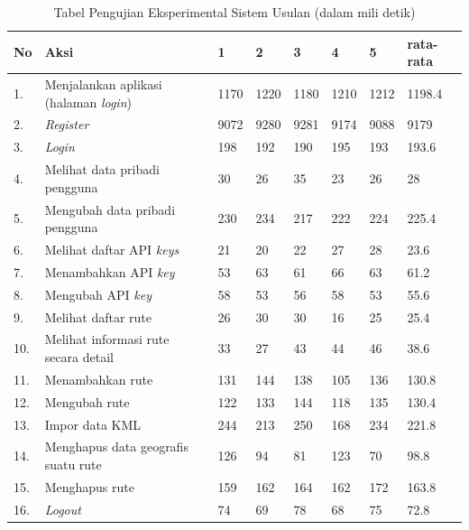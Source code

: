 \begin{table}[htbp]
	\centering
	\caption{Tabel Pengujian Eksperimental Sistem Usulan (dalam mili detik)}
		\begin{tabular}{|p{0.37cm}| p{7cm}| p{1cm}| p{1cm}| p{1cm}| p{1cm}| p{1cm}| p{1cm}|} \hline
		No & Aksi & 1 & 2 & 3 & 4 & 5 & rata-rata \\ \hline
		1. & Menjalankan aplikasi (halaman \textit{login}) & 1170	&	1220	&	1180	&	1210	&	1212	&	1198.4 \\ \hline
 		2. & \textit{Register} & 9072	&	9280	&	9281	&	9174	&	9088	&	9179 \\ \hline
		3. & \textit{Login} & 198	&	192	&	190	&	195	&	193	&	193.6 \\ \hline
		4. & Melihat data pribadi pengguna & 30	&	26	&	35	&	23	&	26	&	28 \\ \hline
		5. & Mengubah data pribadi pengguna & 230	&	234	&	217	&	222	&	224	&	225.4 \\ \hline
		6. & Melihat daftar API \textit{keys} & 21	&	20	&	22	&	27	&	28	&	23.6 \\ \hline
		7. & Menambahkan API \textit{key} & 53	&	63	&	61	&	66	&	63	&	61.2 \\ \hline
		8. & Mengubah API \textit{key} & 58	&	53	&	56	&	58	&	53	&	55.6 \\ \hline
		9. & Melihat daftar rute & 26	&	30	&	30	&	16	&	25	&	25.4 \\ \hline
		10. & Melihat informasi rute secara detail & 33	&	27	&	43	&	44	&	46	&	38.6 \\ \hline
		11. & Menambahkan rute & 131	&	144	&	138	&	105	&	136	&	130.8 \\ \hline
		12. & Mengubah rute & 122	&	133	&	144	&	118	&	135	&	130.4 \\ \hline
		13. & Impor data KML & 244	&	213	&	250	&	168	&	234	&	221.8 \\ \hline
		14. & Menghapus data geografis suatu rute & 126	&	94	&	81	&	123	&	70	&	98.8 \\ \hline
		15. & Menghapus rute & 159	&	162	&	164	&	162	&	172	&	163.8 \\ \hline
		16. & \textit{Logout} & 74	&	69	&	78	&	68	&	75	&	72.8 \\ \hline
		\end{tabular}
	\label{table:hasileksperimental2}
\end{table}

